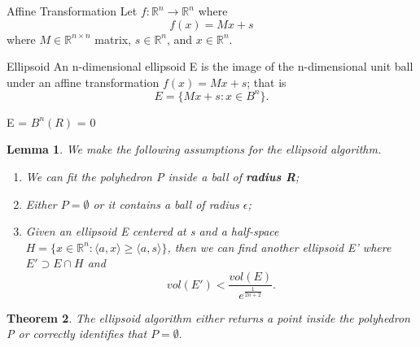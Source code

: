 \documentclass[twoside]{article}
\newcounter{lecnum}
\newtheorem{theorem}{Theorem}[lecnum]
\newtheorem{lemma}[theorem]{Lemma}
\begin{document}
\begin{definition_exam}{Affine Transformation}{} Let $f: \mathbb{R}^n \rightarrow \mathbb{R}^n$ where 
$$
f(x) = Mx + s
$$
where $M \in \mathbb{R}^{n \times n}$ matrix, $s \in \mathbb{R}^n$, and $x \in \mathbb{R}^n.$
\end{definition_exam}

\begin{definition_exam}{Ellipsoid}{} An n-dimensional ellipsoid E is the image of the n-dimensional unit ball under an affine transformation $f(x) = Mx + s$; that is 
$$
E = \{Mx + s: x \in B^n\}.
$$
\end{definition_exam}


\begin{algorithm}
\DontPrintSemicolon
{}
E = $B^n(R)$\;
 = 0\;

\;
\caption{{\sc Ellipsoid Algorithm}}
\label{algo:duplicate}
\end{algorithm}

\begin{lemma}We make the following assumptions for the ellipsoid algorithm.
\begin{enumerate}
\item We can fit the polyhedron P inside a ball of \textbf{radius R};
\item Either $P = \emptyset$ or it contains a ball of radius $\epsilon$;
\item Given an ellipsoid E centered at s and a half-space $H = \{x \in \mathbb{R}^n: \langle a, x\rangle \geq \langle a, s\rangle\}$, then we can find another ellipsoid E' where $E' \supset E \cap H$ and 
$$
vol(E') < \frac{vol(E)}{e^{\frac{1}{2n+2}}}.
$$
\end{enumerate}
\end{lemma}



\begin{theorem}The ellipsoid algorithm either returns a point inside the polyhedron P or correctly identifies that $P = \emptyset.$
\end{theorem}
\end{document}
